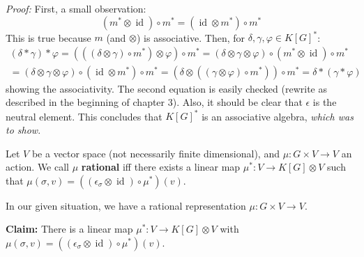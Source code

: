 \textit{Proof:} First, a small observation:
\begin{equation}
  \left(m^\ast \otimes \operatorname{id} \right) \circ m^\ast = \left( \operatorname{id} \otimes m^\ast \right) \circ m^\ast
\end{equation}
This is true because $m$ (and $ \otimes $) is associative.
Then, for $\delta, \gamma, \varphi \in K \left\lbrack G \right\rbrack^\ast$:
\begin{equation}
  \begin{aligned}
  \left( \delta \ast \gamma \right) \ast \varphi
  = \left( \left( \left( \delta \otimes \gamma \right) \circ m^\ast \right) \otimes \varphi \right) \circ m^\ast
  = \left( \delta \otimes \gamma \otimes \varphi \right) \circ \left( m^\ast \otimes \operatorname{id} \right) \circ m^\ast \\
  = \left( \delta \otimes \gamma \otimes \varphi \right) \circ \left( \operatorname{id} \otimes m^\ast \right) \circ m^\ast
  = \left( \delta \otimes \left( \left( \gamma \otimes \varphi \right) \circ m^\ast \right) \right) \circ m^\ast
  = \delta \ast \left( \gamma \ast \varphi \right)
  \end{aligned}
\end{equation}
showing the associativity.
The second equation is easily checked (rewrite as described in the beginning of chapter 3).
Also, it should be clear that $\epsilon$ is the neutral element.
This concludes that $K \left\lbrack G \right\rbrack^\ast$ is an associative algebra, \textit{which was to show}.

\smallskip
\begin{definition}
  Let $V$ be a vector space (not necessarily finite dimensional), and $ \mu : G \times V \longrightarrow V $ an action.
  We call $ \mu $ \textbf{rational} iff there exists a linear map $ \mu^\ast : V \longrightarrow K[G] \otimes V $ such that $ \mu \left( \sigma , v \right) = \left( \left( \epsilon_\sigma \otimes \operatorname{id} \right) \circ \mu^\ast \right) \left(v\right) $. 
\end{definition}
In our given situation, we have a rational representation $\mu : G \times V \longrightarrow V$.

\textbf{Claim:} There is a linear map $\mu^\ast : V \longrightarrow K \left\lbrack G \right\rbrack \otimes V$ with $ \mu \left( \sigma , v \right) = \left( \left( \epsilon_\sigma \otimes \operatorname{id} \right) \circ \mu^\ast \right) \left(v\right)$.


